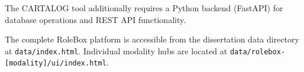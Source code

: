 The CARTALOG tool additionally requires a Python backend (FastAPI) for database operations and REST API functionality.

\begin{kaobox}[title=Platform Access]
The complete RoleBox platform is accessible from the dissertation data directory at \texttt{data/index.html}. Individual modality hubs are located at \texttt{data/rolebox-[modality]/ui/index.html}.
\end{kaobox}
